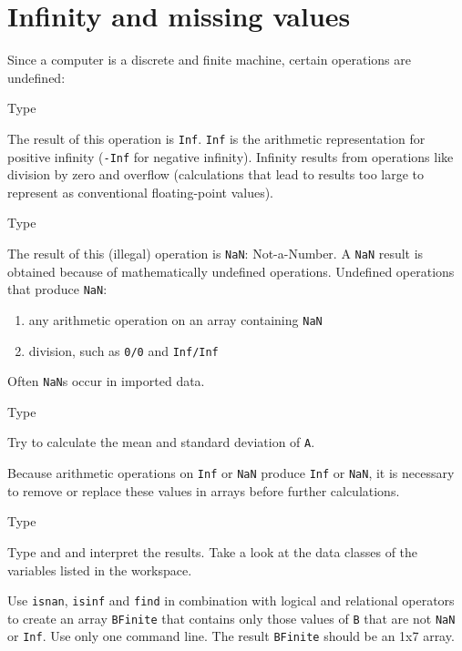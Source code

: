 \chapter{Infinity and missing values}
\thispagestyle{fancy}
\label{ch:infinity-etc}



Since a computer is a discrete and finite machine, certain operations are undefined:
\begin{action}
Type 
\end{action}
The result of this operation is {\tt Inf}. {\tt Inf} is the arithmetic representation for positive infinity ({\tt -Inf} for negative infinity). Infinity results from operations like division by zero and overflow (calculations that lead to results too large to represent as conventional floating-point values).
\begin{action}
Type 
\end{action}
The result of this (illegal) operation is {\tt NaN}: Not-a-Number. A {\tt NaN} result is obtained because of mathematically undefined operations. Undefined operations that produce {\tt NaN}: 
\begin{enumerate}
\item any arithmetic operation on an array containing {\tt NaN}
\item division, such as {\tt 0/0} and {\tt Inf/Inf}
\end{enumerate}
Often {\tt NaN}s occur in imported data.
\begin{action}
Type
\end{action}
\begin{action}
Try to calculate the mean and standard deviation of {\tt A}.
\end{action}
Because arithmetic operations on {\tt Inf} or {\tt NaN} produce {\tt Inf} or {\tt NaN}, it is necessary to remove or replace these values in arrays before further calculations.
\begin{action}
Type
\end{action}
\begin{action}
Type
and
and interpret the results. Take a look at the data classes of the variables listed in the workspace.
\end{action}
\begin{action}
Use {\tt isnan}, {\tt isinf} and {\tt find} in combination with logical and relational operators to create an array {\tt BFinite} that contains only those values of {\tt B} that are not {\tt NaN} or {\tt Inf}. Use only one command line. The result {\tt BFinite} should be an 1x7 array.
\end{action}

